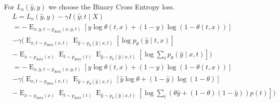 \documentclass[oneside,12pt]{article}
\begin{document}
%
For $L_o(\hat{y}, y)$ we choose the Binary Cross Entropy loss.
%
\begin{equation}\label{eq:lossExample01}
    \begin{split}
        &L = L_o(\hat{y}, y) - \gamma I(\hat{y};t \mid X)\\
        &= -\operatorname{E}_{x,y,t \sim p_{data}(x,y,t)}\left[y \operatorname{log}\theta(t,x) + (1-y)\operatorname{log}(1-\theta(t,x))\right]\\ 
        &- \gamma (\operatorname{E}_{x,t \sim p_{data}(x,t)} \operatorname{E}_{\hat{y} \sim p_\theta(\hat{y} \mid x,t)} \left[ 
        \operatorname{log} p_\theta(\hat{y} \mid t,x) \right]\\
        &-\operatorname{E}_{x \sim p_{data}(x)} \operatorname{E}_{t \sim p_{data}(t)} \operatorname{E}_{\hat{y} \sim p_\theta(\hat{y} \mid x,t)} \left[ \operatorname{log} \sum_t p_\theta(\hat{y} \mid x, t) \right])\\
        &= -\operatorname{E}_{x,y,t \sim p_{data}(x,y,t)}\left[y \operatorname{log}\theta(t,x) + (1-y)\operatorname{log}(1-\theta(t,x))\right]\\ 
        &- \gamma (\operatorname{E}_{x,t \sim p_{data}(x,t)} \operatorname{E}_{\hat{y} \sim p_\theta(\hat{y} \mid x,t)} \left[ 
        \hat{y}\operatorname{log}\theta + (1-\hat{y})\operatorname{log}(1-\theta) \right]\\
        &-\operatorname{E}_{x \sim p_{data}(x)} \operatorname{E}_{t \sim p_{data}(t)} \operatorname{E}_{\hat{y} \sim p_\theta(\hat{y} \mid x,t)} \left[ \operatorname{log} \sum_t 
        \left(\theta\hat{y} + (1-\theta)(1-\hat{y})\right)p(t) \right])
    \end{split}
\end{equation}
%
%
\end{document}
